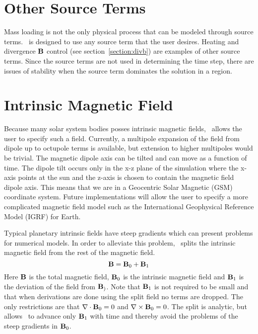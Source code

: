 \section{Other Source Terms \label{section:other_sources}}

Mass loading is not the only physical process that can be modeled
through source terms.  \BATSRUS\ is designed to use any source term
that the user desires.  Heating and divergence $\bf B$ control (see
section~\ref{section:divb}) are examples of other source terms.  Since the source terms are
not used in determining the time step, there are issues of stability
when the source term dominates the solution in a region.

\section{Intrinsic Magnetic Field \label{section:B0}}

Because many solar system bodies posses intrinsic magnetic fields,
\BATSRUS\ allows the user to specify such a field.  Currently, 
a multipole expansion of the field from dipole up to octupole terms 
is available, but extension to higher multipoles would be trivial.  The
magnetic dipole axis can be tilted and can move as a function
of time.  The dipole tilt occurs only in the x-z plane of the
simulation where the x-axis points at the sun and the z-axis is chosen
to contain the magnetic field dipole axis.  This means that we are in a
Geocentric Solar Magnetic (GSM) coordinate system.
Future implementations will allow the user to specify a
more complicated magnetic field model such as the International
Geophysical Reference Model (IGRF) for Earth.

Typical planetary intrinsic fields have steep gradients which can
present problems for numerical models.  In order to alleviate this
problem, \BATSRUS\ splits the intrinsic magnetic field from the 
rest of the magnetic field.
\begin{equation}
{\bf B} = {\bf B}_0 + {\bf B}_1
\end{equation}
Here ${\bf B}$ is the total magnetic field, ${\bf B}_0$ is the
intrinsic magnetic field and  ${\bf B}_1$ is the deviation of the field
from ${\bf B}_)$.  Note that ${\bf B}_1$ is not required to be small and
that when derivations are done using the split field no terms are
dropped.  
The only restrictions are that $\nabla \cdot {\bf B}_0 = 0$ and
$\nabla \times {\bf B}_0 = 0$. 
The split is analytic, but allows \BATSRUS\ to advance only
${\bf B}_1$ with time and thereby avoid the problems of the steep
gradients in ${\bf B}_0$.

